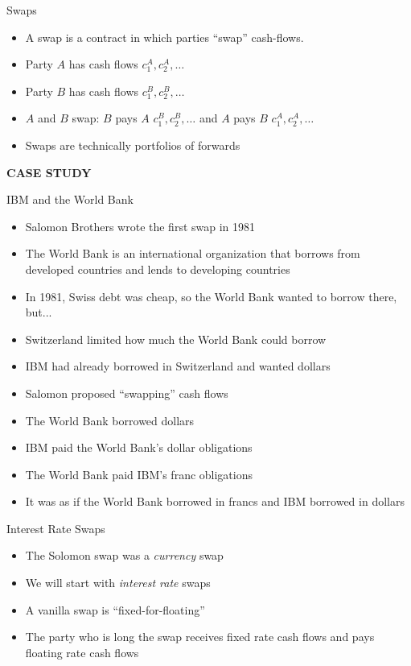 \documentclass{beamer}
\begin{document}
\begin{frame}{Swaps}
\begin{itemize}
    \item A swap is a contract in which parties ``swap'' cash-flows. 
    \item Party $A$ has cash flows $c_{1}^{A},c_{2}^{A},\ldots$
    \item Party $B$ has cash flows $c_{1}^{B},c_{2}^{B},\ldots$
    \item $A$ and $B$ swap: $B$ pays $A$ $c_{1}^{B},c_{2}^{B},\ldots$ and $A$ pays $B$ $c_{1}^{A},c_{2}^{A},\ldots$
    \item Swaps are technically portfolios of forwards
\end{itemize}
\end{frame}

\begin{frame}
    \begin{center}
        \textbf{CASE STUDY}
    \end{center}
\end{frame}

\begin{frame}{IBM and the World Bank}
    \begin{itemize}
        \item Salomon Brothers wrote the first swap in 1981
        \item The World Bank is an international organization that borrows from developed countries and lends to developing countries
        \item In 1981, Swiss debt was cheap, so the World Bank wanted to borrow there, but...
        \item Switzerland limited how much the World Bank could borrow
        \item IBM had already borrowed in Switzerland and wanted dollars
        \item Salomon proposed ``swapping'' cash flows
        \item The World Bank borrowed dollars
        \item IBM paid the World Bank's dollar obligations
        \item The World Bank paid IBM's franc obligations
        \item It was as if the World Bank borrowed in francs and IBM borrowed in dollars
    \end{itemize}
\end{frame}

\begin{frame}{Interest Rate Swaps}
    \begin{itemize}
        \item The Solomon swap was a \textit{currency} swap
        \item We will start with \textit{interest rate} swaps
        \item A vanilla swap is ``fixed-for-floating''
        \item The party who is long the swap receives fixed rate cash flows and pays floating rate cash flows 
    \end{itemize}
\end{frame}
\end{document}
